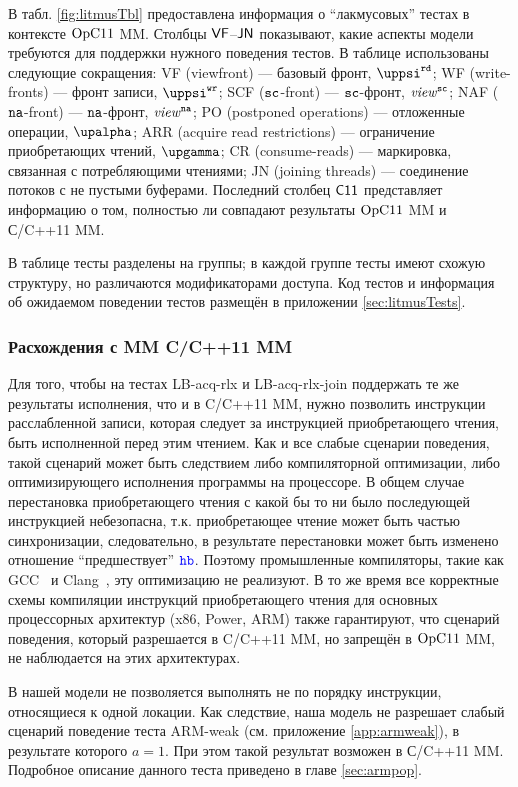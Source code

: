 В табл. \ref{fig:litmusTbl} предоставлена информация о ``лакмусовых'' тестах в контексте $\mathrm{OpC11}$ MM.
Столбцы ${\sf VF}$--${\sf JN}$ показывают, какие аспекты модели требуются для поддержки нужного поведения тестов.
В таблице использованы следующие сокращения:
  \textsf{VF} (viewfront) --- базовый фронт, $\stPsiRead$;
  \textsf{WF} (write-fronts) --- фронт записи, $\stPsiWrite$;
  \textsf{SCF} (${\mathtt{sc}}$-front) --- ${\mathtt{sc}}$-фронт, $\mathit{view}^{\text{\scriptsize{\texttt{sc}}}}$;
  \textsf{NAF} ($\mathtt{na}$-front) --- $\mathtt{na}$-фронт, $\mathit{view}^{\text{\scriptsize{\texttt{na}}}}$;
  \textsf{PO} (postponed operations) --- отложенные операции, $\stAlpha$;
  \textsf{ARR} (acquire read restrictions) --- ограничение приобретающих чтений, $\stGamma$;
  \textsf{CR} (consume-reads) --- маркировка, связанная с потребляющими чтениями;
  \textsf{JN} (joining threads) --- соединение потоков с не пустыми буферами.
Последний столбец ${\sf C11}$ представляет информацию о том, полностью ли совпадают результаты $\mathrm{OpC11}$ MM и С/C++11 MM.

В таблице тесты разделены на группы;
в каждой группе тесты имеют схожую структуру, но различаются модификаторами доступа.
Код тестов и информация об ожидаемом поведении тестов размещён в приложении \ref{sec:litmusTests}.

\subsubsection{Расхождения с MM C/C++11 MM}
Для того, чтобы на тестах \textrm{LB-acq-rlx} и \textrm{LB-acq-rlx-join} поддержать те же результаты исполнения,
что и в C/C++11 MM, нужно позволить инструкции расслабленной записи, которая следует за
инструкцией приобретающего чтения, быть исполненной перед этим чтением.
Как и все слабые сценарии поведения, такой сценарий может быть следствием либо компиляторной оптимизации,
либо оптимизирующего исполнения программы на процессоре.
В общем случае перестановка приобретающего чтения с какой бы то ни было последующей инструкцией небезопасна,
т.к. приобретающее чтение может быть частью синхронизации, следовательно, в результате перестановки может быть
изменено отношение ``предшествует'' $\lHB$. Поэтому промышленные компиляторы, такие как
GCC~\cite{GCC} и Clang~\cite{CLANG}, эту оптимизацию не реализуют.
В то же время все корректные схемы компиляции инструкций приобретающего чтения для основных процессорных
архитектур (x86, Power, ARM)
также гарантируют, что сценарий поведения, который разрешается в C/C++11 MM, но запрещён в $\mathrm{OpC11}$ MM,
не наблюдается на этих архитектурах.

В нашей модели не позволяется выполнять не по порядку инструкции, относящиеся к одной локации.
Как следствие, наша модель не разрешает слабый сценарий поведение теста \textrm{ARM-weak}
(см. приложение \ref{app:armweak}), в результате которого $a = 1$.
При этом такой результат возможен в С/C++11 MM.
Подробное описание данного теста приведено в главе \ref{sec:armpop}.

